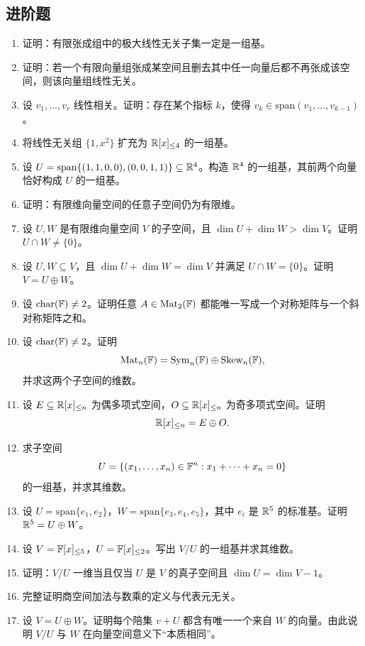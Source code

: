 \subsection*{进阶题}
\begin{enumerate}[label=\arabic*., start=31, leftmargin=2.5em]
  \item \medium 证明：有限张成组中的极大线性无关子集一定是一组基。
  \item \medium 证明：若一个有限向量组张成某空间且删去其中任一向量后都不再张成该空间，则该向量组线性无关。
  \item \medium 设 $v_1,\dots,v_r$ 线性相关。证明：存在某个指标 $k$，使得 $v_k\in \mathrm{span}(v_1,\dots,v_{k-1})$。
  \item \medium 将线性无关组 $\{1,x^2\}$ 扩充为 $\mathbb{R}[x]_{\le 4}$ 的一组基。
  \item \medium 设 $U=\mathrm{span}\{(1,1,0,0),(0,0,1,1)\}\subseteq \mathbb{R}^4$。构造 $\mathbb{R}^4$ 的一组基，其前两个向量恰好构成 $U$ 的一组基。
  \item \medium 证明：有限维向量空间的任意子空间仍为有限维。
  \item \medium 设 $U,W$ 是有限维向量空间 $V$ 的子空间，且 $\dim U+\dim W>\dim V$。证明 $U\cap W\ne \{0\}$。
  \item \medium 设 $U,W\subseteq V$，且 $\dim U+\dim W=\dim V$ 并满足 $U\cap W=\{0\}$。证明 $V=U\oplus W$。
  \item \medium 设 $\mathrm{char}(\mathbb{F})\ne 2$。证明任意 $A\in \mathrm{Mat}_2(\mathbb{F})$ 都能唯一写成一个对称矩阵与一个斜对称矩阵之和。
  \item \medium 设 $\mathrm{char}(\mathbb{F})\ne 2$。证明
  \[
  \mathrm{Mat}_n(\mathbb{F})=\mathrm{Sym}_n(\mathbb{F})\oplus \mathrm{Skew}_n(\mathbb{F}),
  \]
  并求这两个子空间的维数。
  \item \medium 设 $E\subseteq \mathbb{R}[x]_{\le n}$ 为偶多项式空间，$O\subseteq \mathbb{R}[x]_{\le n}$ 为奇多项式空间。证明
  \[
  \mathbb{R}[x]_{\le n}=E\oplus O.
  \]
  \item \medium 求子空间
  \[
  U=\{(x_1,\dots,x_n)\in \mathbb{F}^n:x_1+\cdots+x_n=0\}
  \]
  的一组基，并求其维数。
  \item \medium 设 $U=\mathrm{span}\{e_1,e_2\}$，$W=\mathrm{span}\{e_3,e_4,e_5\}$，其中 $e_i$ 是 $\mathbb{R}^5$ 的标准基。证明 $\mathbb{R}^5=U\oplus W$。
  \item \medium 设 $V=\mathbb{F}[x]_{\le 5}$，$U=\mathbb{F}[x]_{\le 2}$。写出 $V/U$ 的一组基并求其维数。
  \item \medium 证明：$V/U$ 一维当且仅当 $U$ 是 $V$ 的真子空间且 $\dim U=\dim V-1$。
  \item \medium 完整证明商空间加法与数乘的定义与代表元无关。
  \item \medium 设 $V=U\oplus W$。证明每个陪集 $v+U$ 都含有唯一一个来自 $W$ 的向量。由此说明 $V/U$ 与 $W$ 在向量空间意义下“本质相同”。

\end{enumerate}
